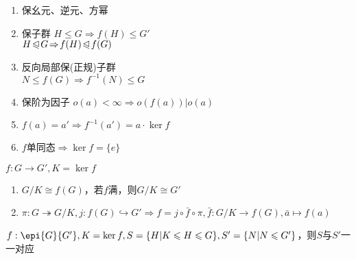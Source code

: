 \documentclass[a4paper,10pt]{ctexart}
\newcommand*{\impl}{\Rightarrow}
\renewcommand*{\leq}{\leqslant}
\newcommand*{\nmsubgroupeq}{\trianglelefteqslant}
\begin{document}
\begin{multicols}{3}
\begin{theorem}[同态性质]
        \begin{enumerate}
            \item 保幺元、逆元、方幂
            \item 保子群 $H \leq G \impl f(H) \leq G'$\\
                  $H \!\nmsubgroupeq\! G \!\impl\! f(H) \!\nmsubgroupeq\! f(G)$
            \item 反向局部保(正规)子群 \\
                  $N \!\leq\! f(G) \!\impl\! f^{-1}(N) \!\leq\! G$
            \item 保阶为因子 $o(a) \!<\! \infty \!\impl\! o(f(a)) | o(a)$
            \item $f(a) = a' \impl f^{-1}(a') = a \cdot \ker f$
            \item $f$单同态$\impl \ker f = \{e\}$
        \end{enumerate}
    \end{theorem}

    \begin{theorem}[同态基本定理]
        $f: G \rightarrow G', K = \ker f$

        \begin{enumerate}
            \item $G/K \cong f(G)$，若$f$满，则$G/K \cong G'$
            \item $\pi: G \twoheadrightarrow G/K, j: f(G) \hookrightarrow G' \impl f = j \circ \bar{f} \circ \pi, \bar{f}: G/K \rightarrow f(G), \bar{a} \mapsto f(a)$
        \end{enumerate}

    \end{theorem}

    \begin{theorem}[子群对应定理]
        $f: \epi{G}{G'}, K = \ker f, S = \{ H | K \leq H \leq G \}, S' = \{ N | N \leq G' \}$，则$S$与$S'$一一对应
    \end{theorem}


\end{multicols}
\end{document}
